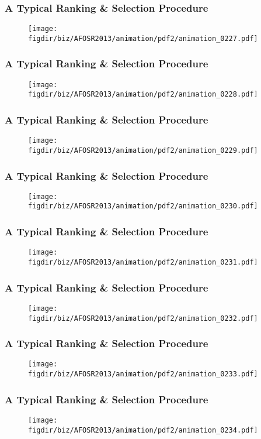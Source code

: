 \documentclass[13pt]{beamer}
\newcommand{\figdir}{../../fig}
\begin{document}
{\begin{frame}\frametitle{A Typical Ranking \& Selection Procedure}\begin{figure}\texttt{[image: \\figdir/biz/AFOSR2013/animation/pdf2/animation\_0227.pdf]}\end{figure}\end{frame}
\begin{frame}\frametitle{A Typical Ranking \& Selection Procedure}\begin{figure}\texttt{[image: \\figdir/biz/AFOSR2013/animation/pdf2/animation\_0228.pdf]}\end{figure}\end{frame}
\begin{frame}\frametitle{A Typical Ranking \& Selection Procedure}\begin{figure}\texttt{[image: \\figdir/biz/AFOSR2013/animation/pdf2/animation\_0229.pdf]}\end{figure}\end{frame}
\begin{frame}\frametitle{A Typical Ranking \& Selection Procedure}\begin{figure}\texttt{[image: \\figdir/biz/AFOSR2013/animation/pdf2/animation\_0230.pdf]}\end{figure}\end{frame}
\begin{frame}\frametitle{A Typical Ranking \& Selection Procedure}\begin{figure}\texttt{[image: \\figdir/biz/AFOSR2013/animation/pdf2/animation\_0231.pdf]}\end{figure}\end{frame}
\begin{frame}\frametitle{A Typical Ranking \& Selection Procedure}\begin{figure}\texttt{[image: \\figdir/biz/AFOSR2013/animation/pdf2/animation\_0232.pdf]}\end{figure}\end{frame}
\begin{frame}\frametitle{A Typical Ranking \& Selection Procedure}\begin{figure}\texttt{[image: \\figdir/biz/AFOSR2013/animation/pdf2/animation\_0233.pdf]}\end{figure}\end{frame}
\begin{frame}\frametitle{A Typical Ranking \& Selection Procedure}\begin{figure}\texttt{[image: \\figdir/biz/AFOSR2013/animation/pdf2/animation\_0234.pdf]}\end{figure}\end{frame}
}
\end{document}
